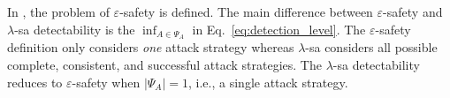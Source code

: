\begin{remark}
In  \citep{meira-goes:2020towards,Fahim2024-wodes}, the problem of $\varepsilon$-safety is defined.
The main difference between $\varepsilon$-safety and $\lambda$-sa detectability is the $\inf_{A\in \Psi_A}$ in Eq.~\ref{eq:detection_level}.
The $\varepsilon$-safety definition only considers \emph{one} attack strategy whereas $\lambda$-sa considers all possible complete, consistent, and successful attack strategies.
The $\lambda$-sa detectability reduces to $\varepsilon$-safety when $|\Psi_A| = 1$, i.e., a single attack strategy.
\end{remark}

